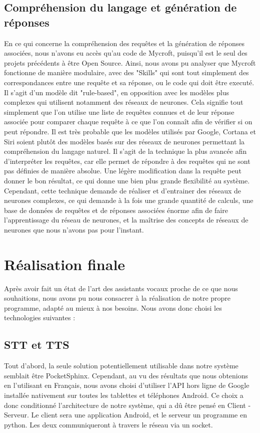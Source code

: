 \documentclass[a4paper,10pt]{report}
\begin{document}
    \section{Compréhension du langage et génération de réponses}
    {En ce qui concerne la compréhension des requêtes et la génération de réponses associées, nous n'avons eu accès qu'au code de Mycroft, puisqu'il est le seul des projets précédents à être Open Source. Ainsi, nous avons pu analyser que Mycroft fonctionne de manière modulaire, avec des "Skills" qui sont tout simplement des correspondances entre une requête et sa réponse, ou le code qui doit être executé. Il s'agit d'un modèle dit "rule-based", en opposition avec les modèles plus complexes qui utilisent notamment des réseaux de neurones. Cela signifie tout simplement que l'on utilise une liste de requêtes connues et de leur réponse associée pour comparer chaque requête à ce que l'on connaît afin de vérifier si on peut répondre.}
    {\newline Il est très probable que les modèles utilisés par Google, Cortana et Siri soient plutôt des modèles basés sur des réseaux de neurones permettant la compréhension du langage naturel. Il s'agit de la technique la plus avancée afin d'interpréter les requêtes, car elle permet de répondre à des requêtes qui ne sont pas définies de manière absolue. Une légère modification dans la requête peut donner le bon résultat, ce qui donne une bien plus grande flexibilité au système. Cependant, cette technique demande de réaliser et d'entrainer des réseaux de neurones complexes, ce qui demande à la fois une grande quantité de calculs, une base de données de requêtes et de réponses associées énorme afin de faire l'apprentissage du réseau de neurones, et la maîtrise des concepts de réseaux de neurones que nous n'avons pas pour l'instant.}

    \chapter{Réalisation finale}
    \label{sec:realisation}
    {Après avoir fait un état de l'art des assistants vocaux proche de ce que nous souhaitions, nous avons pu nous consacrer à la réalisation de notre propre programme, adapté au mieux à nos besoins. Nous avons donc choisi les technologies suivantes :}
      \section{STT et TTS}
      {Tout d'abord, la seule solution potentiellement utilisable dans notre système semblait être PocketSphinx. Cependant, au vu des résultats que nous obtenions en l'utilisant en Français, nous avons choisi d'utiliser l'API hors ligne de Google installée nativement sur toutes les tablettes et téléphones Android. \newline}
      {Ce choix a donc conditionné l'architecture de notre système, qui a dû être pensé en Client - Serveur. Le client sera une application Android, et le serveur un programme en python. Les deux communiqueront à travers le réseau via un socket.}
\end{document}
